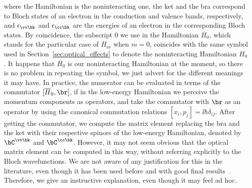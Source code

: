 \noindent where the Hamiltonian is the noninteracting one, the ket and the bra correspond to Bloch states of an electron in the conduction and valence bands, respectively, and $\epsilon_{\vv \bk}$ and $\epsilon_{\cc \bk}$ are the energies of an electron in the corresponding Bloch states.
By coincidence, the subscript $0$ we use in the Hamiltonian $\overline{H}_0$, which stands for the particular case of $\overline{H}_m$ when $m=0$, coincides with the same symbol used in Section~\ref{sec:optical_effects} to denote the noninteracting Hamiltonian $H_0$.
It happens that $\overline{H}_0$ is our noninteracting Hamiltonian at the moment, so there is no problem in repeating the symbol, we just advert for the different meanings it may have.
In practice, the numerator can be evaluated in terms of the commutator $[\overline{H}_0,\br]$, if in the low-energy Hamiltonian we perceive the momentum components as operators, and take the commutator with $\br$ as an operator by using the canonical commutation relations $[x_i,p_j] = \ii \hbar \delta_{ij}$.
After getting the commutator, we compute the matrix element replacing the bra and the ket with their respective spinors of the low-energy Hamiltonian, denoted by $\bC^{\vv \bk}$ and $\bC^{\cc \bk}$.
However, it may not seem obvious that the optical matrix element can be computed in this way, without referring explicitly to the Bloch wavefunctions.
We are not aware of any justification for this in the literature, even though it has been used before and with good final results~\cite{Ventura_2019,Mauricio_2022,Henriques_Epstein_Peres_2022,Henriques_PRB2022}.
Therefore, we give an instructive explanation, even though it may feel ad hoc.

